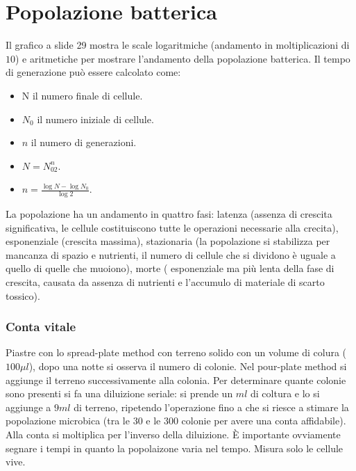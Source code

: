 \chapter{Popolazione batterica}
Il grafico a slide 29 mostra le scale logaritmiche (andamento in moltiplicazioni di $10$) e aritmetiche per mostrare l'andamento della popolazione batterica. Il tempo di generazione 
pu\`o essere calcolato come:
\begin{itemize}
	\item N il numero finale di cellule.
	\item $N_0$ il numero iniziale di cellule.
	\item $n$ il numero di generazioni.
	\item $N=N_02^n$.
	\item $n=\frac{\log N - \log N_0}{\log 2}$.
\end{itemize}
La popolazione ha un andamento in quattro fasi: latenza (assenza di crescita significativa, le cellule costituiscono tutte le operazioni necessarie alla crecita), esponenziale (crescita 
massima), stazionaria (la popolazione si stabilizza per mancanza di spazio e nutrienti, il numero di cellule che si dividono \`e uguale a quello di quelle che muoiono), morte (
esponenziale ma pi\`u lenta della fase di crescita, causata da assenza di nutrienti e l'accumulo di materiale di scarto tossico). 
\subsection{Conta vitale}
Piastre con lo spread-plate method con terreno solido con un volume di colura ($100 \mu l$), dopo una notte si osserva il numero di colonie. Nel pour-plate method si aggiunge il terreno
successivamente alla colonia. Per determinare quante colonie sono presenti si fa una diluizione seriale: si prende un $ml$ di coltura e lo si aggiunge a $9ml$ di terreno, ripetendo 
l'operazione fino a che si riesce a stimare la popolazione microbica (tra le $30$ e le $300$ colonie per avere una conta affidabile). Alla conta si moltiplica per l'inverso della 
diluizione. \`E importante ovviamente segnare i tempi in quanto la popolaizone varia nel tempo. Misura solo le cellule vive.
